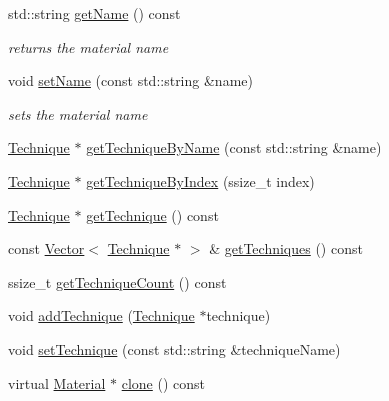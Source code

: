 \begin{DoxyCompactItemize}
\item 
\mbox{\label{classMaterial_a764714e37bbe1499d750b58b4056460b}} 
std\+::string \hyperlink{classMaterial_a764714e37bbe1499d750b58b4056460b}{get\+Name} () const
\begin{DoxyCompactList}\small\item\em returns the material name \end{DoxyCompactList}\item 
\mbox{\label{classMaterial_aeb35f4d95c6de13f6181cd75b7a693cf}} 
void \hyperlink{classMaterial_aeb35f4d95c6de13f6181cd75b7a693cf}{set\+Name} (const std\+::string \&name)
\begin{DoxyCompactList}\small\item\em sets the material name \end{DoxyCompactList}\item 
\hyperlink{classTechnique}{Technique} $\ast$ \hyperlink{classMaterial_ae0243fa49b7a0c4ca4c0d240ba487369}{get\+Technique\+By\+Name} (const std\+::string \&name)
\item 
\hyperlink{classTechnique}{Technique} $\ast$ \hyperlink{classMaterial_a3f6e7d4e911f32fbbde7b7e9cf286316}{get\+Technique\+By\+Index} (ssize\+\_\+t index)
\item 
\hyperlink{classTechnique}{Technique} $\ast$ \hyperlink{classMaterial_ab608fdd95b62c5e489715708c1107591}{get\+Technique} () const
\item 
const \hyperlink{classVector}{Vector}$<$ \hyperlink{classTechnique}{Technique} $\ast$ $>$ \& \hyperlink{classMaterial_a402a3684251c8ac436b7412ac361c253}{get\+Techniques} () const
\item 
ssize\+\_\+t \hyperlink{classMaterial_aff04e4a8db76db38e7dcc526f0d88608}{get\+Technique\+Count} () const
\item 
void \hyperlink{classMaterial_a88f5ba975802241aa0ce984257b8a56a}{add\+Technique} (\hyperlink{classTechnique}{Technique} $\ast$technique)
\item 
void \hyperlink{classMaterial_a8f575095237a64a95d08a2a3062acc4f}{set\+Technique} (const std\+::string \&technique\+Name)
\item 
virtual \hyperlink{classMaterial}{Material} $\ast$ \hyperlink{classMaterial_a68b641cda1fe7dc4ad8dae55a4ec6f93}{clone} () const
\end{DoxyCompactItemize}
